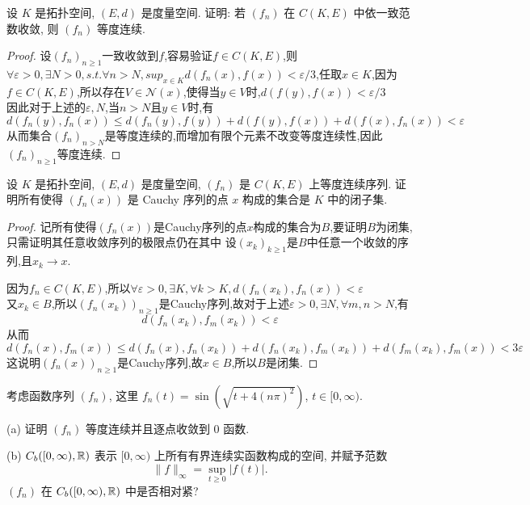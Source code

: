 




\begin{exercise}
    设 $K$ 是拓扑空间, $(E,d)$ 是度量空间. 证明: 
    若 $(f_{n})$ 在 $C(K, E)$ 中依一致范数收敛, 则 $(f_{n})$ 等度连续.
\end{exercise}

\begin{proof}
    设$(f_n)_{n\geq 1}$一致收敛到$f$,容易验证$f\in C(K,E)$,则$\forall\varepsilon>0,\exists N>0,s.t.\forall n>N,sup_{x\in K}d(f_n(x),f(x))<\varepsilon/3$,任取$x\in K$,因为$f\in C(K,E)$,所以存在$V\in\mathcal{N}(x)$,使得当$y\in V$时,$d(f(y),f(x))<\varepsilon/3$\\
    因此对于上述的$\varepsilon,N$,当$n>N$且$y\in V$时,有
    \[d(f_n(y),f_n(x))\leq d(f_n(y),f(y))+d(f(y),f(x))+d(f(x),f_n(x))<\varepsilon\]
    从而集合$(f_n)_{n>N}$是等度连续的,而增加有限个元素不改变等度连续性,因此$(f_n)_{n\geq 1}$等度连续.
\end{proof}



\begin{exercise}
    设 $K$ 是拓扑空间, $(E, d)$ 是度量空间, $(f_{n})$ 是 $C(K, E)$ 上等度连续序列. 
    证明所有使得 $(f_{n}(x))$ 是 Cauchy 序列的点 $x$ 构成的集合是 $K$ 中的闭子集.
\end{exercise}

\begin{proof}
记所有使得$(f_n(x))$是Cauchy序列的点$x$构成的集合为$B$,要证明$B$为闭集,只需证明其任意收敛序列的极限点仍在其中
设$(x_k)_{k\geq 1}$是$B$中任意一个收敛的序列,且$x_k\to x$.

因为$f_n\in C(K,E)$,所以$\forall\varepsilon>0,\exists K,\forall k>K,d(f_n(x_k),f_n(x))<\varepsilon$\\
又$x_k\in B$,所以$(f_n(x_k))_{n\geq 1}$是Cauchy序列,故对于上述$\varepsilon>0,\exists N,\forall m,n>N$,有
\[d(f_n(x_k),f_m(x_k))<\varepsilon\]
从而\[d(f_n(x),f_m(x))\leq d(f_n(x),f_n(x_k))+d(f_n(x_k),f_m(x_k))+d(f_m(x_k),f_m(x))<3\varepsilon\]
这说明$(f_n(x))_{n\geq 1}$是Cauchy序列,故$x\in B$,所以$B$是闭集.
\end{proof}



\begin{exercise}
    考虑函数序列 $(f_{n})$, 这里 $f_{n}(t)=\sin\left(\sqrt{t+4(n\pi)^2}\right)$, $t\in[0,\infty)$.

    (a) 证明 $(f_{n})$ 等度连续并且逐点收敛到 $0$ 函数.

    (b) $C_{b}([0,\infty),\mathbb{R})$ 表示 $[0, \infty)$ 上所有有界连续实函数构成的空间, 并赋予范数
    \[\|f\|_{\infty}=\sup_{t\geq 0}|f(t)|.\]
    $(f_n)$ 在 $C_b([0,\infty),\mathbb{R})$ 中是否相对紧?
\end{exercise}

